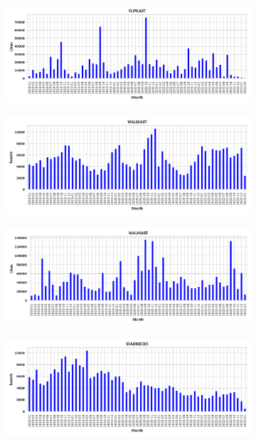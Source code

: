 \begin{figure}[t]
\begin{subfigure}[b]{0.45\textwidth}
         \centering
         \includegraphics[width=1\columnwidth,scale=1]{images/company_tweets_vs_time/flipkart_likes.png}
         \caption{}
    \end{subfigure}
    \begin{subfigure}[b]{0.45\textwidth}
         \centering
         \includegraphics[width=1\columnwidth,scale=1]{images/company_tweets_vs_time/walmart_tweets.png}
         \caption{}
    \end{subfigure}
    \begin{subfigure}[b]{0.45\textwidth}
         \centering
         \includegraphics[width=1\columnwidth,scale=1]{images/company_tweets_vs_time/walmart_likes.png}
         \caption{}
    \end{subfigure}
    \begin{subfigure}[b]{0.45\textwidth}
         \centering
         \includegraphics[width=1\columnwidth,scale=1]{images/company_tweets_vs_time/starbucks_tweets.png}

\end{subfigure}
\end{figure}
